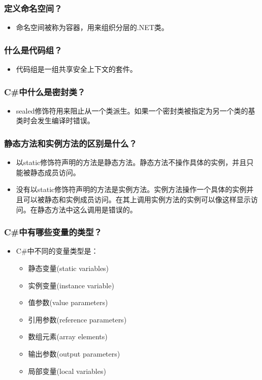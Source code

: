 \documentclass[9pt, b5paper]{article}
\begin{document}
\subsubsection{定义命名空间？}
\label{sec-1-2-11}
\begin{itemize}
\item 命名空间被称为容器，用来组织分层的.NET类。
\end{itemize}
\subsubsection{什么是代码组？}
\label{sec-1-2-12}
\begin{itemize}
\item 代码组是一组共享安全上下文的套件。
\end{itemize}
\subsubsection{C\#中什么是密封类？}
\label{sec-1-2-13}
\begin{itemize}
\item sealed修饰符用来阻止从一个类派生。如果一个密封类被指定为另一个类的基类时会发生编译时错误。
\end{itemize}
\subsubsection{静态方法和实例方法的区别是什么？}
\label{sec-1-2-14}
\begin{itemize}
\item 以static修饰符声明的方法是静态方法。静态方法不操作具体的实例，并且只能被静态成员访问。
\item 没有以static修饰符声明的方法是实例方法。实例方法操作一个具体的实例并且可以被静态和实例成员访问。在其上调用实例方法的实例可以像这样显示访问。在静态方法中这么调用是错误的。
\end{itemize}
\subsubsection{C\#中有哪些变量的类型？}
\label{sec-1-2-15}
\begin{itemize}
\item C\#中不同的变量类型是：
\begin{itemize}
\item 静态变量(static variables)
\item 实例变量(instance variable)
\item 值参数(value parameters)
\item 引用参数(reference parameters)
\item 数组元素(array elements)
\item 输出参数(output parameters)
\item 局部变量(local variables)
\end{itemize}
\end{itemize}
\end{document}
